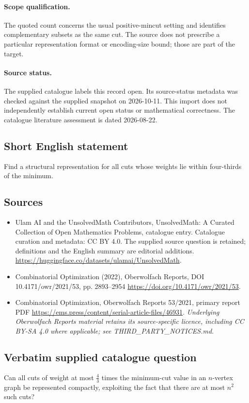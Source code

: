\documentclass[11pt]{article}
\begin{document}
\paragraph{Scope qualification.}
The quoted count concerns the usual positive-mincut setting and identifies complementary subsets as the same cut. The source does not prescribe a particular representation format or encoding-size bound; those are part of the target.
\paragraph{Source status.}
The supplied catalogue labels this record open. Its source-status metadata was checked against the supplied snapshot on 2026-10-11. This import does not independently establish current open status or mathematical correctness. The catalogue literature assessment is dated 2026-08-22.
\subsection{Short English statement}
Find a structural representation for all cuts whose weights lie within four-thirds of the minimum.
\subsection{Sources}
\begin{itemize}
\item[S1] Ulam AI and the UnsolvedMath Contributors, UnsolvedMath: A Curated Collection of Open Mathematics Problems, catalogue entry. Catalogue curation and metadata: CC BY 4.0. The supplied source question is retained; definitions and the English summary are editorial additions.
\url{https://huggingface.co/datasets/ulamai/UnsolvedMath}.
\item[S2] Combinatorial Optimization (2022), Oberwolfach Reports, DOI 10.4171/owr/2021/53, pp. 2893--2954
\url{https://doi.org/10.4171/owr/2021/53}.
\item[S3] Combinatorial Optimization, Oberwolfach Reports 53/2021, primary report PDF
\url{https://ems.press/content/serial-article-files/46931}.
\textit{Underlying Oberwolfach Reports material retains its source-specific licence, including CC BY-SA 4.0 where applicable; see THIRD\_PARTY\_NOTICES.md.}
\end{itemize}
\subsection{Verbatim supplied catalogue question}
Can all cuts of weight at most $\tfrac43$ times the minimum-cut value in an $n$-vertex graph be represented compactly, exploiting the fact that there are at most $n^2$ such cuts?
\end{document}
